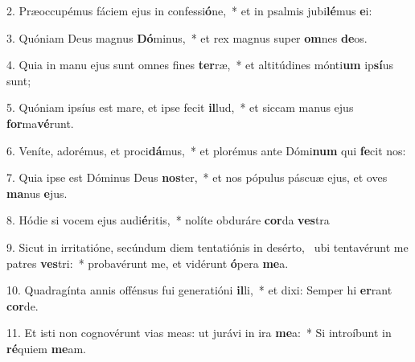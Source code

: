 2. Præoccupémus fáciem ejus in confessi\textbf{ó}ne,~*  et in psalmis jubi\textbf{lé}mus \textbf{e}i:\

3. Quóniam Deus magnus \textbf{Dó}minus,~*  et rex magnus super \textbf{om}nes \textbf{de}os.\

4. Quia in manu ejus sunt omnes fines \textbf{ter}ræ,~*  et altitúdines mónti\textbf{um} ip\textbf{sí}us sunt;\

5. Quóniam ipsíus est mare, et ipse fecit \textbf{il}lud,~*  et siccam manus ejus \textbf{for}ma\textbf{vé}runt.\

6. Veníte, adorémus, et proci\textbf{dá}mus,~*  et plorémus ante Dómi\textbf{num} qui \textbf{fe}cit nos:\

7. Quia ipse est Dóminus Deus \textbf{nos}ter,~*  et nos pópulus páscuæ ejus, et oves \textbf{ma}nus \textbf{e}jus.\

8. Hódie si vocem ejus audi\textbf{é}ritis,~*  nolíte obduráre \textbf{cor}da \textbf{ves}tra\

9. Sicut in irritatióne, secúndum diem tentatiónis in desérto, \dag\  ubi tentavérunt me patres \textbf{ves}tri:~*  probavérunt me, et vidérunt \textbf{ó}pera \textbf{me}a.\

10. Quadragínta annis offénsus fui generatióni \textbf{il}li,~*  et dixi: Semper hi \textbf{er}rant \textbf{cor}de.\

11. Et isti non cognovérunt vias meas: ut jurávi in ira \textbf{me}a:~*  Si introíbunt in \textbf{ré}quiem \textbf{me}am.\

